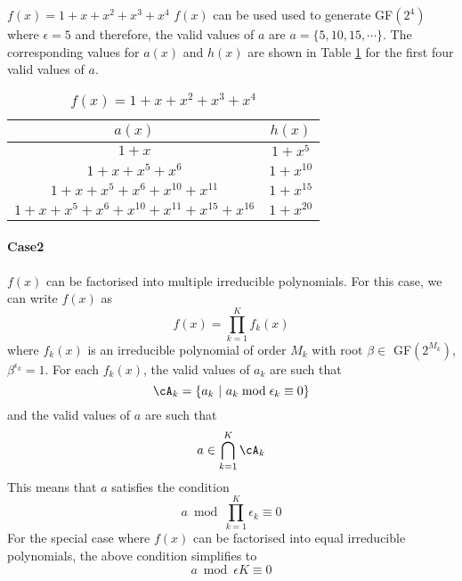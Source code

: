 \begin{example}
$f(x)=1+x+x^2+x^3+x^4$\newline
$f(x)$ can be used used to generate GF$(2^4)$ where $\epsilon=5$ and therefore, the valid values of $a$ are $a=\{5,10,15,\cdots\}$. The corresponding values for $a(x)$ and $h(x)$ are shown in Table \ref{novelTab3} for the first four valid values of $a$.

\begin{table}[htbp]
\caption{$f(x)=1+x+x^2+x^3+x^4$}
\centering
\begin{tabular}{c c} 
 \hline
 $a(x)$ & $h(x)$  \\ [0.5ex] 
 \hline\hline
$1+x$ &$1+x^5$\\ 
$1+x+x^5+x^6$ &$1+x^{10}$  \\
$1+x+x^5+x^6+x^{10}+x^{11}$ & $1+x^{15}$ \\
$1+x+x^5+x^6+x^{10}+x^{11}+x^{15}+x^{16}$ &$1+x^{20}$  
 \end{tabular}
 \label{novelTab3}
\end{table}
\label{ex-3}
\end{example}


\paragraph{Case2}$f(x)$ can be factorised into multiple irreducible polynomials. \newline
For this case, we can write $f(x)$ as $$f(x)=\prod_{k=1}^{K}f_k(x)$$ where $f_k(x)$ is an irreducible polynomial of order $M_k$ with root $\beta \in $ GF$(2^{M_k})$, $\beta^{\epsilon_k}=1$. 
For each $f_k(x)$, the valid values of  $a_k$ are such that 
$$ \cA_k=\{a_k~ |~ a_k \bmod \epsilon_k \equiv 0\}$$ and the valid values of $a$ are such that
$$a \in  \bigcap_{k=1}^{K} \cA_k$$
This means that $a$ satisfies the condition
$$ a \bmod  \prod_{k=1}^{K} \epsilon_k \equiv 0$$
For the special case where $f(x)$ can be factorised into equal irreducible polynomials, the above condition simplifies to 
$$a \bmod \epsilon K \equiv 0$$

